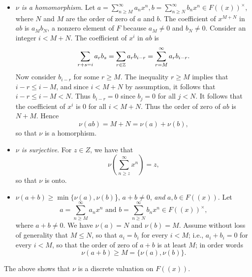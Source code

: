 \begin{enumerate}
\begin{enumerate}
               \begin{itemize}
                  \item \textit{$\nu$ is a homomorphism}. Let
                        $a = \sum_{n \ge M}^\infty a_nx^n,
                         b = \sum_{n \ge N}^\infty b_nx^n \in F((x))^\times$,
                        where $N$ and $M$ are the order of zero of $a$ and $b$.
                        The coefficient of $x^{M+N}$ in $ab$ is $a_Mb_N$, a
                        nonzero element of $F$ because $a_M \neq 0$ and
                        $b_N \neq 0$. Consider an integer $i < M + N$.
                        The coefficient of $x^i$ in $ab$ is
                        $$\sum_{r+s=i}a_rb_s = \sum_{r\in\mathbb{Z}}a_rb_{i-r} =
                          \sum_{r=M}^\infty a_rb_{i-r}.$$
                        Now consider $b_{i - r}$ for some $r \ge M$. The
                        inequality $r \ge M$ implies that $i - r \le i - M$, and
                        since $i < M + N$ by assumption, it follows that
                        $i - r \le i - M < N$. Thus $b_{i - r} = 0$ since
                        $b_j = 0$ for all $j < N$. It follows that the
                        coefficient of $x^i$ is 0 for all $i < M + N$. Thus the
                        order of zero of $ab$ is $N + M$. Hence
                        $$\nu(ab) = M + N = \nu(a) + \nu(b),$$
                        so that $\nu$ is a homorphism.
                  \item \textit{$\nu$ is surjective}. For $z \in Z$, we have
                        that
                        $$\nu\left(\sum_{n \ge z}^\infty x^n\right) = z,$$
                        so that $\nu$ is onto.
                  \item $\nu(a + b) \ge \min\{\nu(a), \nu(b)$\}, $a + b \neq 0$,
                        \textit{ and } $a, b \in F((x))$. Let
                        $$a = \sum_{n \ge M}^\infty a_nx^n \text{ and }
                         b = \sum_{n \ge N}^\infty b_nx^n \in F((x))^\times,$$
                        where $a + b \neq 0$. We have $\nu(a) = N$ and
                        $\nu(b) = M$. Assume without loss of generality that
                        $M \le N$, so that $a_i = b_i$ for every $i < M$; i.e.,
                        $a_i + b_i = 0$ for every $i < M$, so that the order of
                        zero of $a + b$ is at least $M$; in order words
                        $$\nu(a + b) \ge M = \{\nu(a), \nu(b)\}.$$
               \end{itemize}
               The above shows that $\nu$ is a discrete valuation on $F((x))$.

\end{enumerate}
\end{enumerate}
